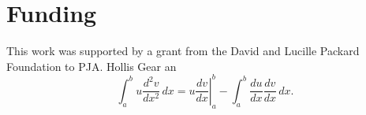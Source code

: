 \section{Funding}
\label{funding} 
This work was supported by a grant from the David and Lucille Packard Foundation to PJA. Hollis Gear an
\begin{equation}
\label{eqn:drag}
	\int_a^bu\frac{d^2v}{dx^2}\,dx
	=\left.u\frac{dv}{dx}\right|_a^b
	-\int_a^b\frac{du}{dx}\frac{dv}{dx}\,dx.
\end{equation}
